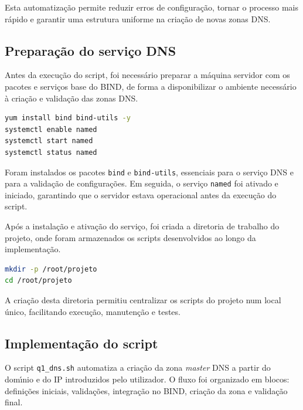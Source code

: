 Esta automatiza\c{c}\~ao permite reduzir erros de configura\c{c}\~ao, tornar o processo mais r\'apido e garantir uma estrutura uniforme na cria\c{c}\~ao de novas zonas DNS.

\subsection{Prepara\c{c}\~ao do servi\c{c}o DNS}

Antes da execu\c{c}\~ao do script, foi necess\'ario preparar a m\'aquina servidor com os pacotes e servi\c{c}os base do BIND, de forma a disponibilizar o ambiente necess\'ario \`a cria\c{c}\~ao e valida\c{c}\~ao das zonas DNS.

\begin{lstlisting}[language=bash,caption={Preparacao inicial do servico DNS}]
yum install bind bind-utils -y
systemctl enable named
systemctl start named
systemctl status named
\end{lstlisting}

Foram instalados os pacotes \texttt{bind} e \texttt{bind-utils}, essenciais para o servi\c{c}o DNS e para a valida\c{c}\~ao de configura\c{c}\~oes. Em seguida, o servi\c{c}o \texttt{named} foi ativado e iniciado, garantindo que o servidor estava operacional antes da execu\c{c}\~ao do script.

Ap\'os a instala\c{c}\~ao e ativa\c{c}\~ao do servi\c{c}o, foi criada a diretoria de trabalho do projeto, onde foram armazenados os scripts desenvolvidos ao longo da implementa\c{c}\~ao.

\begin{lstlisting}[language=bash,caption={Criacao da diretoria de trabalho}]
mkdir -p /root/projeto
cd /root/projeto
\end{lstlisting}

A cria\c{c}\~ao desta diretoria permitiu centralizar os scripts do projeto num local \'unico, facilitando execu\c{c}\~ao, manuten\c{c}\~ao e testes.

\subsection{Implementa\c{c}\~ao do script}

O script \texttt{q1\_dns.sh} automatiza a cria\c{c}\~ao da zona \textit{master} DNS a partir do dom\'{\i}nio e do IP introduzidos pelo utilizador. O fluxo foi organizado em blocos: defini\c{c}\~oes iniciais, valida\c{c}\~oes, integra\c{c}\~ao no BIND, cria\c{c}\~ao da zona e valida\c{c}\~ao final.

